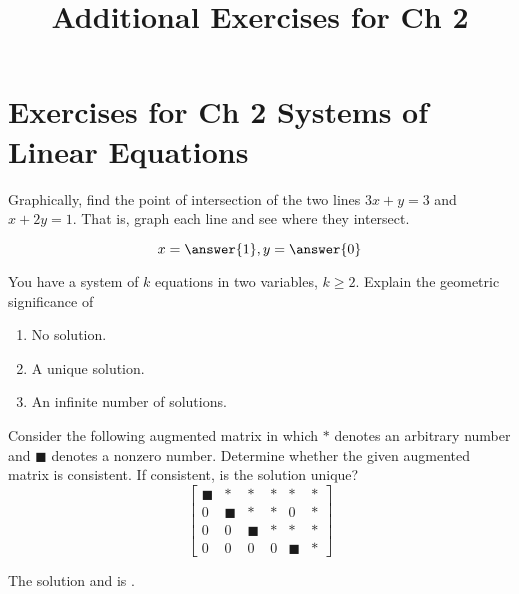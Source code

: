 \documentclass{ximera}
\title{Additional Exercises for Ch 2} \license{CC BY-NC-SA 4.0}
\begin{document}
\begin{abstract}
\end{abstract}
\maketitle

\section*{Exercises for Ch 2 Systems of Linear Equations}

\begin{problem}\label{prb:2.2}
Graphically, find the point of intersection of the two lines $
3x+y=3$ and $x+2y=1.$ That is, graph each line
and see where they intersect.

 $$x=\answer{1},y=\answer{0}$$
\end{problem}

\begin{problem}\label{prb:2.3} You have a system of $k$ equations in two variables, $k\geq 2$.
Explain the geometric significance of

\begin{enumerate}
\item No solution.
\item A unique solution.
\item An infinite number of solutions.
\end{enumerate}
\end{problem}

\begin{problem}\label{prb:2.4}
Consider the following augmented matrix in which $\ast $ denotes an
arbitrary number and $\blacksquare $ denotes a nonzero number. Determine
whether the given augmented matrix is consistent. If consistent, is the
solution unique?
\begin{equation*}
\left[
\begin{array}{ccccc|c}
\blacksquare & \ast & \ast & \ast & \ast & \ast \\
0 & \blacksquare & \ast & \ast & 0 & \ast \\
0 & 0 & \blacksquare & \ast & \ast & \ast \\
0 & 0 & 0 & 0 & \blacksquare & \ast
\end{array}
\right] 
\end{equation*}

The solution  and is .
\end{problem}
\end{document}
